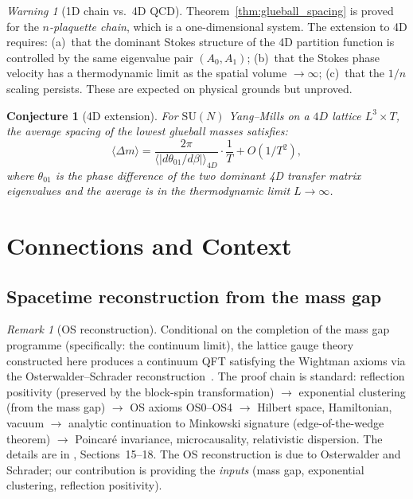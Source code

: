 \documentclass[12pt]{article}
\newtheorem{conjecture}[theorem]{Conjecture}
\theoremstyle{definition}
\theoremstyle{remark}
\newtheorem{remark}[theorem]{Remark}
\newtheorem{warning}[theorem]{Warning}
\newcommand{\SU}{\mathrm{SU}}
\begin{document}
\begin{warning}[1D chain vs.\ 4D QCD]
\label{warn:1d_vs_4d}
Theorem~\ref{thm:glueball_spacing} is proved for the
\emph{$n$-plaquette chain}, which is a one-dimensional system.
The extension to 4D requires: (a)~that the dominant Stokes structure
of the 4D partition function is controlled by the same eigenvalue
pair $(A_0, A_1)$; (b)~that the Stokes phase velocity has a
thermodynamic limit as the spatial volume $\to \infty$; (c)~that
the $1/n$ scaling persists.  These are expected on physical grounds
but unproved.
\end{warning}

\begin{conjecture}[4D extension]
\label{conj:4d_extension}
For $\SU(N)$ Yang--Mills on a $4D$ lattice $L^3 \times T$, the
average spacing of the lowest glueball masses satisfies:
\begin{equation}
\langle \Delta m \rangle =
\frac{2\pi}{\langle |d\theta_{01}/d\beta| \rangle_{4D}}
\cdot \frac{1}{T} + O(1/T^2),
\end{equation}
where $\theta_{01}$ is the phase difference of the two dominant
4D transfer matrix eigenvalues and the average is in the
thermodynamic limit $L \to \infty$.
\end{conjecture}

\section{Connections and Context}
\label{sec:connections}

\subsection{Spacetime reconstruction from the mass gap}
\label{sec:os_reconstruction}

\begin{remark}[OS reconstruction]
\label{rem:os_reconstruction}
Conditional on the completion of the mass gap programme
\cite{Olbryk2026MG} (specifically: the continuum limit), the
lattice gauge theory constructed here produces a continuum QFT
satisfying the Wightman axioms via the Osterwalder--Schrader
reconstruction~\cite{OS73}.  The proof chain is standard:
reflection positivity (preserved by the block-spin transformation)
$\to$ exponential clustering (from the mass gap)
$\to$ OS axioms OS0--OS4
$\to$ Hilbert space, Hamiltonian, vacuum
$\to$ analytic continuation to Minkowski signature (edge-of-the-wedge
theorem)
$\to$ Poincar\'e invariance, microcausality, relativistic dispersion.
The details are in \cite{Olbryk2026MG}, Sections~15--18.  The OS
reconstruction is due to Osterwalder and Schrader; our contribution
is providing the \emph{inputs} (mass gap, exponential clustering,
reflection positivity).
\end{remark}
\end{document}

